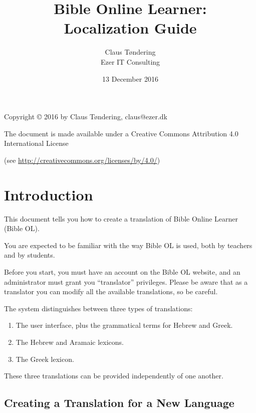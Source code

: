 \documentclass[11pt,oneside,a4paper]{memoir}
\title{Bible Online Learner:\\Localization Guide}
\author{Claus Tøndering\\Ezer IT Consulting}
\date{13 December 2016}
\begin{document}
\begin{titlingpage*}
\maketitle

\begin{center}
Copyright © 2016 by Claus Tøndering, claus@ezer.dk

\vspace{5mm}

The document is made available under a Creative Commons Attribution 4.0 International License

(see \url{http://creativecommons.org/licenses/by/4.0/})
\end{center}
\end{titlingpage*}


\clearpage
\tableofcontents
{} %

\chapter{Introduction}

This document tells you how to create a translation of Bible Online Learner (Bible OL).

You are expected to be familiar with the way Bible OL is used, both by teachers and by students.

Before you start, you must have an account on the Bible OL website, and an administrator must grant
you ``translator'' privileges. Please be aware that as a translator you can modify all the available
translations, so be careful.

The system distinguishes between three types of translations:

\begin{enumerate}
\item The user interface, plus the grammatical terms for Hebrew and Greek.
\item The Hebrew and Aramaic lexicons.
\item The Greek lexicon.
\end{enumerate}

These three translations can be provided independently of one another.


\section{Creating a Translation for a New Language}
\end{document}
